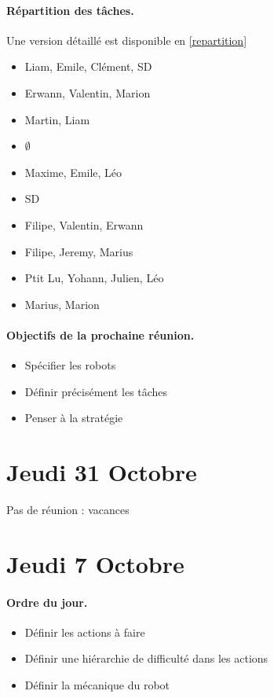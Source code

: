 \documentclass[a4paper,10pt]{report}
\begin{document}
\begin{spacing}{1.5}
\begin{multicols}{2}
\paragraph*{Répartition des tâches.}
Une version détaillé est disponible en \ref{repartition}
\begin{itemize}
\item Liam, Emile, Clément, SD
\item Erwann, Valentin, Marion
\item Martin, Liam
\item $\emptyset$
\item Maxime, Emile, Léo
\item SD
\item Filipe, Valentin, Erwann
\item Filipe, Jeremy, Marius
\item Ptit Lu, Yohann, Julien, Léo
\item Marius, Marion
\end{itemize}
\end{multicols}

\paragraph*{Objectifs de la prochaine réunion.}
\begin{itemize}
\item Spécifier les robots
\item Définir précisément les tâches
\item Penser à la stratégie
\end{itemize}

\newpage
\section*{Jeudi 31 Octobre}
Pas de réunion : vacances
\newpage
\section*{Jeudi 7 Octobre}
\paragraph*{Ordre du jour.}
\begin{itemize}
\item Définir les actions à faire
\item Définir une hiérarchie de difficulté dans les actions
\item Définir la mécanique du robot
\end{itemize}


\end{spacing}
\end{document}
